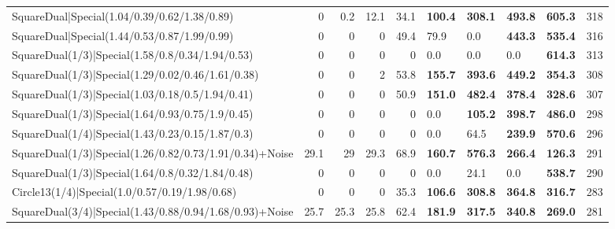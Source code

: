 \begin{tabular}{lrrrrllllr}
 SquareDual|Special(1.04/0.39/0.62/1.38/0.89)            &          0   &          0.2 &         12.1 &            34.1 & \textbf{100.4} & \textbf{308.1} & \textbf{493.8} & \textbf{605.3}  &          318 \\
 SquareDual|Special(1.44/0.53/0.87/1.99/0.99)            &          0   &          0   &          0   &            49.4 & 79.9           & 0.0            & \textbf{443.3} & \textbf{535.4}  &          316 \\
 SquareDual(1/3)|Special(1.58/0.8/0.34/1.94/0.53)        &          0   &          0   &          0   &             0   & 0.0            & 0.0            & 0.0            & \textbf{614.3}  &          313 \\
 SquareDual(1/3)|Special(1.29/0.02/0.46/1.61/0.38)       &          0   &          0   &          2   &            53.8 & \textbf{155.7} & \textbf{393.6} & \textbf{449.2} & \textbf{354.3}  &          308 \\
 SquareDual(1/3)|Special(1.03/0.18/0.5/1.94/0.41)        &          0   &          0   &          0   &            50.9 & \textbf{151.0} & \textbf{482.4} & \textbf{378.4} & \textbf{328.6}  &          307 \\
 SquareDual(1/3)|Special(1.64/0.93/0.75/1.9/0.45)        &          0   &          0   &          0   &             0   & 0.0            & \textbf{105.2} & \textbf{398.7} & \textbf{486.0}  &          298 \\
 SquareDual(1/4)|Special(1.43/0.23/0.15/1.87/0.3)        &          0   &          0   &          0   &             0   & 0.0            & 64.5           & \textbf{239.9} & \textbf{570.6}  &          296 \\
 SquareDual(1/3)|Special(1.26/0.82/0.73/1.91/0.34)+Noise &         29.1 &         29   &         29.3 &            68.9 & \textbf{160.7} & \textbf{576.3} & \textbf{266.4} & \textbf{126.3}  &          291 \\
 SquareDual(1/3)|Special(1.64/0.8/0.32/1.84/0.48)        &          0   &          0   &          0   &             0   & 0.0            & 24.1           & 0.0            & \textbf{538.7}  &          290 \\
 Circle13(1/4)|Special(1.0/0.57/0.19/1.98/0.68)          &          0   &          0   &          0   &            35.3 & \textbf{106.6} & \textbf{308.8} & \textbf{364.8} & \textbf{316.7}  &          283 \\
 SquareDual(3/4)|Special(1.43/0.88/0.94/1.68/0.93)+Noise &         25.7 &         25.3 &         25.8 &            62.4 & \textbf{181.9} & \textbf{317.5} & \textbf{340.8} & \textbf{269.0}  &          281 \\

\end{tabular}
